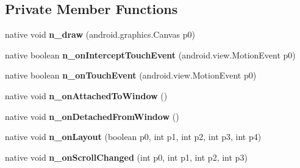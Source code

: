 \subsection*{Private Member Functions}
\begin{DoxyCompactItemize}
\item 
\mbox{\label{classmd5b60ffeb829f638581ab2bb9b1a7f4f3f_1_1ScrollViewRenderer_a7596ebe0714b10e6b5917ecfb0a52f51}} 
native void {\bfseries n\+\_\+draw} (android.\+graphics.\+Canvas p0)
\item 
\mbox{\label{classmd5b60ffeb829f638581ab2bb9b1a7f4f3f_1_1ScrollViewRenderer_aef12a8bfcc86a2321c6b2affa8cbe2ee}} 
native boolean {\bfseries n\+\_\+on\+Intercept\+Touch\+Event} (android.\+view.\+Motion\+Event p0)
\item 
\mbox{\label{classmd5b60ffeb829f638581ab2bb9b1a7f4f3f_1_1ScrollViewRenderer_a62eb6d326ae4fcd7d9730dd8600c9ace}} 
native boolean {\bfseries n\+\_\+on\+Touch\+Event} (android.\+view.\+Motion\+Event p0)
\item 
\mbox{\label{classmd5b60ffeb829f638581ab2bb9b1a7f4f3f_1_1ScrollViewRenderer_a1ada2556ed1249686076a92c1d9bc70c}} 
native void {\bfseries n\+\_\+on\+Attached\+To\+Window} ()
\item 
\mbox{\label{classmd5b60ffeb829f638581ab2bb9b1a7f4f3f_1_1ScrollViewRenderer_aeb36115da7b8f42b18b82a73bd3905bc}} 
native void {\bfseries n\+\_\+on\+Detached\+From\+Window} ()
\item 
\mbox{\label{classmd5b60ffeb829f638581ab2bb9b1a7f4f3f_1_1ScrollViewRenderer_af028092f84bfc2747d8a55eacd9e833a}} 
native void {\bfseries n\+\_\+on\+Layout} (boolean p0, int p1, int p2, int p3, int p4)
\item 
\mbox{\label{classmd5b60ffeb829f638581ab2bb9b1a7f4f3f_1_1ScrollViewRenderer_ab9747abe611665b03334315d01f64462}} 
native void {\bfseries n\+\_\+on\+Scroll\+Changed} (int p0, int p1, int p2, int p3)
\end{DoxyCompactItemize}
